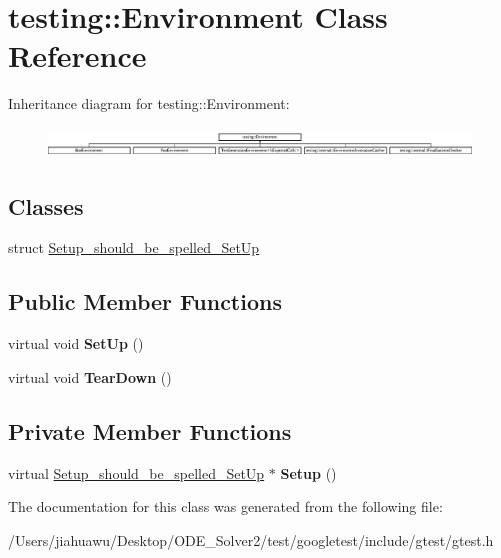 \hypertarget{classtesting_1_1_environment}{}\section{testing\+:\+:Environment Class Reference}
\label{classtesting_1_1_environment}
Inheritance diagram for testing\+:\+:Environment\+:\begin{figure}[H]
\begin{center}
\leavevmode
\includegraphics[height=0.785965cm]{classtesting_1_1_environment}
\end{center}
\end{figure}
\subsection*{Classes}
\begin{DoxyCompactItemize}
\item 
struct \mbox{\hyperlink{structtesting_1_1_environment_1_1_setup__should__be__spelled___set_up}{Setup\+\_\+should\+\_\+be\+\_\+spelled\+\_\+\+Set\+Up}}
\end{DoxyCompactItemize}
\subsection*{Public Member Functions}
\begin{DoxyCompactItemize}
\item 
\mbox{\label{classtesting_1_1_environment_a1bf8cafaa9d4eba9feb98655ee434eb3}} 
virtual void {\bfseries Set\+Up} ()
\item 
\mbox{\label{classtesting_1_1_environment_a039bdaa705c46b9b88234cf4d3bb6254}} 
virtual void {\bfseries Tear\+Down} ()
\end{DoxyCompactItemize}
\subsection*{Private Member Functions}
\begin{DoxyCompactItemize}
\item 
\mbox{\label{classtesting_1_1_environment_a6096a69b03f6eb727a69a39f854cc87b}} 
virtual \mbox{\hyperlink{structtesting_1_1_environment_1_1_setup__should__be__spelled___set_up}{Setup\+\_\+should\+\_\+be\+\_\+spelled\+\_\+\+Set\+Up}} $\ast$ {\bfseries Setup} ()
\end{DoxyCompactItemize}


The documentation for this class was generated from the following file\+:\begin{DoxyCompactItemize}
\item 
/\+Users/jiahuawu/\+Desktop/\+O\+D\+E\+\_\+\+Solver2/test/googletest/include/gtest/gtest.\+h\end{DoxyCompactItemize}
